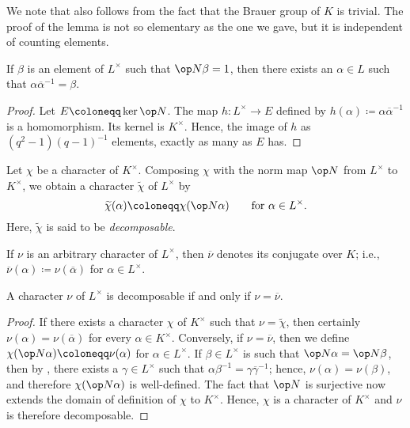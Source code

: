 \documentclass[../main.tex]{subfiles}
\begin{document}
We note that  also follows from the fact that the Brauer group of $K$ is trivial. The proof of the lemma is not so elementary as the one we gave, but it is independent of counting elements.
\begin{corollary} \label{cor:h90}
	If $\beta$ is an element of $L^\times$ such that $\op N\beta=1$, then there exists an $\alpha\in L$ such that $\alpha\overline\alpha^{-1}=\beta$.
\end{corollary}
\begin{proof}
	Let $E\coloneqq\ker\op N$. The map $h\colon L^\times\to E$ defined by $h(\alpha)\coloneqq\alpha\overline\alpha^{-1}$ is a homomorphism. Its kernel is $K^\times$. Hence, the image of $h$ as $\left(q^2-1\right)(q-1)^{-1}$ elements, exactly as many as $E$ has.
\end{proof}
\begin{definition}[decomposable]
	Let $\chi$ be a character of $K^\times$. Composing $\chi$ with the norm map $\op N$ from $L^\times$ to $K^\times$, we obtain a character $\widetilde\chi$ of $L^\times$ by
	\begin{equation}
		\widetilde\chi(\alpha)\coloneqq\chi(\op N\alpha) \qquad\text{for }\alpha\in L^\times. \label{eq:define-decomp-char}
	\end{equation}
	Here, $\widetilde\chi$ is said to be \textit{decomposable}.
\end{definition}
\begin{notation}
	If $\nu$ is an arbitrary character of $L^\times$, then $\overline\nu$ denotes its conjugate over $K$; i.e., $\overline\nu(\alpha)\coloneqq\nu(\overline\alpha)$ for $\alpha\in L^\times$.
\end{notation}
\begin{lemma} \label{lem:decomp-criterion}
	A character $\nu$ of $L^\times$ is decomposable if and only if $\nu=\overline\nu$.
\end{lemma}
\begin{proof}
	If there exists a character $\chi$ of $K^\times$ such that $\nu=\widetilde\chi$, then certainly $\nu(\alpha)=\nu(\overline\alpha)$ for every $\alpha\in K^\times$. Conversely, if $\nu=\overline\nu$, then we define $\chi(\op N\alpha)\coloneqq\nu(\alpha)$ for $\alpha\in L^\times$. If $\beta\in L^\times$ is such that $\op N\alpha=\op N\beta$, then by , there exists a $\gamma\in L^\times$ such that $\alpha\beta^{-1}=\gamma\overline\gamma^{-1}$; hence, $\nu(\alpha)=\nu(\beta)$, and therefore $\chi(\op N\alpha)$ is well-defined. The fact that $\op N$ is surjective now extends the domain of definition of $\chi$ to $K^\times$. Hence, $\chi$ is a character of $K^\times$ and $\nu$ is therefore decomposable.
\end{proof}
\end{document}
